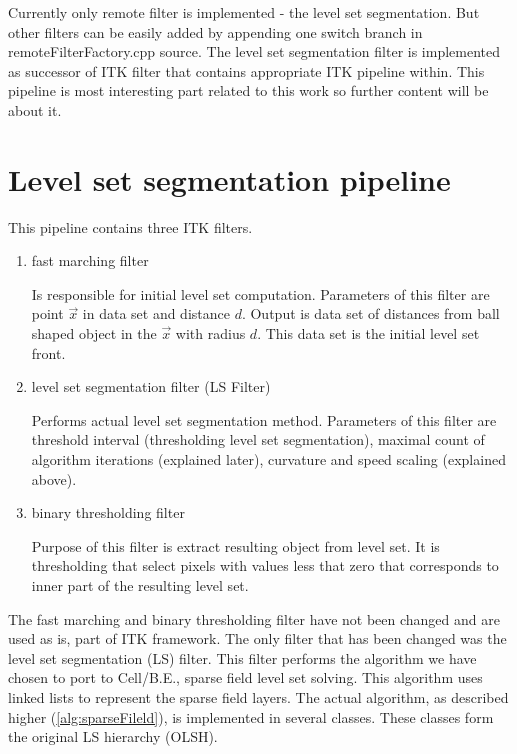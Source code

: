 Currently only remote filter is implemented - the level set segmentation.
But other filters can be easily added by appending one switch branch in remoteFilterFactory.cpp source.
The level set segmentation filter is implemented as successor of ITK filter that contains appropriate ITK pipeline within.
This pipeline is most interesting part related to this work so further content will be about it.

\section{Level set segmentation pipeline}

This pipeline contains three ITK filters.
\begin{enumerate}
  \item{fast marching filter}
  \par
  Is responsible for initial level set computation.
Parameters of this filter are point $\vec{x}$ in data set and distance $d$.
Output is data set of distances from ball shaped object in the $\vec{x}$ with radius $d$.
This data set is the initial level set front.

  \item{level set segmentation filter (LS Filter)}
  \par
  Performs actual level set segmentation method.
Parameters of this filter are threshold interval (thresholding level set segmentation),  maximal count of algorithm iterations (explained later), curvature and speed scaling (explained above).

  \item{binary thresholding filter}
  \par
  Purpose of this filter is extract resulting object from level set.
It is thresholding that select pixels with values less that zero that corresponds to inner part of the resulting level set.
\end{enumerate}

The fast marching and binary thresholding filter have not been changed and are used as is, part of ITK framework.
The only filter that has been changed was the level set segmentation (LS) filter.
This filter performs the algorithm we have chosen to port to Cell/B.E., sparse field level set solving.
This algorithm uses linked lists to represent the sparse field layers.
The actual algorithm, as described higher (\ref{alg:sparseFileld}), is implemented in several classes.
These classes form the original LS hierarchy (OLSH).

